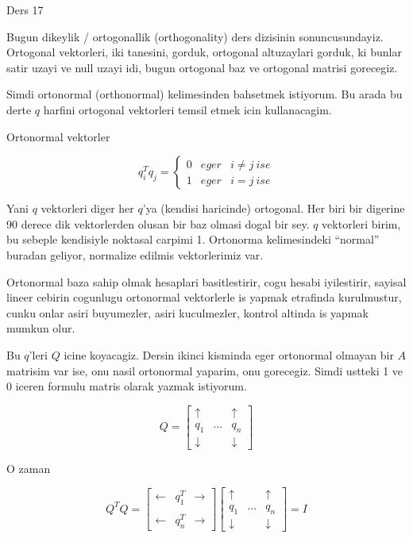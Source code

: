 \documentclass[12pt,fleqn]{article}\usepackage{../common}
\begin{document}
Ders 17

Bugun dikeylik / ortogonallik (orthogonality) ders dizisinin
sonuncusundayiz. Ortogonal vektorleri, iki tanesini, gorduk, ortogonal
altuzaylari gorduk, ki bunlar satir uzayi ve null uzayi idi, bugun
ortogonal baz ve ortogonal matrisi gorecegiz. 

Simdi ortonormal (orthonormal) kelimesinden bahsetmek istiyorum. Bu arada
bu derte $q$ harfini ortogonal vektorleri temsil etmek icin kullanacagim. 

Ortonormal vektorler 

\[ 
q_i^Tq_j = \left\{ \begin{array}{lll}
0 & eger & i \ne j \ ise\\
1 & eger & i = j \ ise
\end{array} \right.
 \]

Yani $q$ vektorleri diger her $q$'ya (kendisi haricinde) ortogonal. Her
biri bir digerine 90 derece dik vektorlerden olusan bir baz olmasi dogal
bir sey. $q$ vektorleri birim, bu sebeple kendisiyle noktasal carpimi
1. Ortonorma kelimesindeki ``normal'' buradan geliyor, normalize edilmis
vektorlerimiz var. 

Ortonormal baza sahip olmak hesaplari basitlestirir, cogu hesabi
iyilestirir, sayisal lineer cebirin cogunlugu ortonormal vektorlerle is
yapmak etrafinda kurulmustur, cunku onlar asiri buyumezler, asiri
kuculmezler, kontrol altinda is yapmak mumkun olur. 

Bu $q$'leri $Q$ icine koyacagiz. Dersin ikinci kisminda eger ortonormal
olmayan bir $A$ matrisim var ise, onu nasil ortonormal yaparim, onu
gorecegiz. Simdi ustteki 1 ve 0 iceren formulu matris olarak yazmak
istiyorum.

\[ 
Q = 
\left[\begin{array}{rrr}
\uparrow &  & \uparrow \\
q_1 & ... &  q_n \\
\downarrow &  & \downarrow 
\end{array}\right]
 \]

O zaman 

\[ 
Q^TQ = 
\left[\begin{array}{rrr}
\leftarrow & q_1^T & \rightarrow \\
& &  \\
\leftarrow & q_n^T & \rightarrow 
\end{array}\right]
\left[\begin{array}{rrr}
\uparrow &  & \uparrow \\
q_1 & ... &  q_n \\
\downarrow &  & \downarrow 
\end{array}\right] = 
I
 \]
\end{document}
